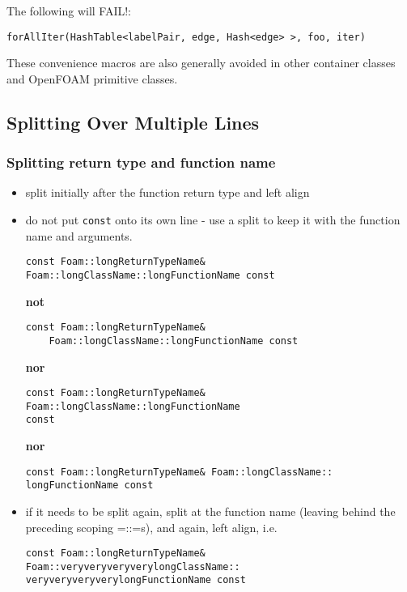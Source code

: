 \documentclass[11pt]{article}
\begin{document}
    The following will FAIL!:


\begin{verbatim}
forAllIter(HashTable<labelPair, edge, Hash<edge> >, foo, iter)
\end{verbatim}
    These convenience macros are also generally avoided in other
    container classes and OpenFOAM primitive classes.
\subsection{Splitting Over Multiple Lines}
\label{sec-1-8}
\subsubsection{Splitting return type and function name}
\label{sec-1-8-1}

\begin{itemize}
\item split initially after the function return type and left align
\item do not put \texttt{const} onto its own line - use a split to keep it with
        the function name and arguments.

\begin{verbatim}
const Foam::longReturnTypeName&
Foam::longClassName::longFunctionName const
\end{verbatim}
        \textbf{not}

\begin{verbatim}
const Foam::longReturnTypeName&
    Foam::longClassName::longFunctionName const
\end{verbatim}
        \textbf{nor}

\begin{verbatim}
const Foam::longReturnTypeName& Foam::longClassName::longFunctionName
const
\end{verbatim}
        \textbf{nor}

\begin{verbatim}
const Foam::longReturnTypeName& Foam::longClassName::
longFunctionName const
\end{verbatim}
\item if it needs to be split again, split at the function name (leaving
        behind the preceding scoping =::=s), and again, left align, i.e.

\begin{verbatim}
const Foam::longReturnTypeName&
Foam::veryveryveryverylongClassName::
veryveryveryverylongFunctionName const
\end{verbatim}
\end{itemize}
\end{document}
